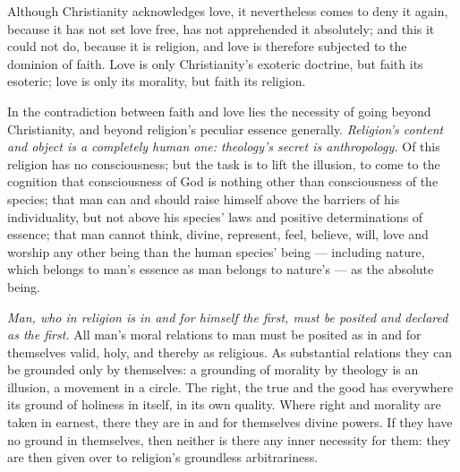 \documentclass[12pt,a4paper]{book}
\begin{document}
Although Christianity acknowledges love, it nevertheless comes to deny it
again, because it has not set love free, has not apprehended it absolutely;
and this it could not do, because it is religion, and love is therefore
subjected to the dominion of faith. Love is only Christianity's exoteric
doctrine, but faith its esoteric; love is only its morality, but faith its
religion.

In the contradiction between faith and love lies the necessity of going beyond
Christianity, and beyond religion's peculiar essence generally.
\emph{Religion's content and object is a completely human one: theology's
secret is anthropology.}
Of this religion has no consciousness; but the task is to lift the illusion,
to come to the cognition that consciousness of God is nothing other than
consciousness of the species; that man can and should raise himself above the
barriers of his individuality, but not above his species' laws and positive
determinations of essence; that man cannot think, divine, represent, feel,
believe, will, love and worship
any other being than the human species' being --- including nature, which
belongs to man's essence as man belongs to nature's --- as the absolute being.

\emph{Man, who in religion is in and for himself the first, must be posited
and declared as the first.} All man's moral relations to man must be posited
as in and for themselves valid, holy, and thereby as religious. As substantial
relations they can be grounded only by themselves: a grounding of morality by
theology is an illusion, a movement in a circle. The right, the true and the
good has everywhere its ground of holiness in itself, in its own quality.
Where right and morality are taken in earnest, there they are in and for
themselves divine powers. If they have no ground in themselves, then neither
is there any inner necessity for them: they are then given over to religion's
groundless arbitrariness.
\end{document}
